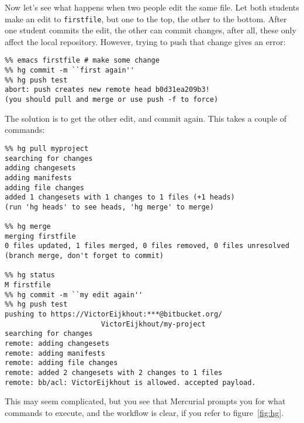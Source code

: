 Now let's see what happens when two people edit the same file.
Let both students make an edit to \verb+firstfile+, but one to the
top, the other to the bottom. After one student commits the edit, the
other can commit changes, after all, these only affect the local repository.
However, trying to push that change gives an error:
\begin{verbatim}
%% emacs firstfile # make some change
%% hg commit -m ``first again''
%% hg push test
abort: push creates new remote head b0d31ea209b3!
(you should pull and merge or use push -f to force)
\end{verbatim}
The solution is to get the other edit, and commit again. This takes a 
couple of commands:
{\small
\begin{verbatim}
%% hg pull myproject
searching for changes
adding changesets
adding manifests
adding file changes
added 1 changesets with 1 changes to 1 files (+1 heads)
(run 'hg heads' to see heads, 'hg merge' to merge)

%% hg merge
merging firstfile
0 files updated, 1 files merged, 0 files removed, 0 files unresolved
(branch merge, don't forget to commit)

%% hg status
M firstfile
%% hg commit -m ``my edit again''
%% hg push test
pushing to https://VictorEijkhout:***@bitbucket.org/
                       VictorEijkhout/my-project
searching for changes
remote: adding changesets
remote: adding manifests
remote: adding file changes
remote: added 2 changesets with 2 changes to 1 files
remote: bb/acl: VictorEijkhout is allowed. accepted payload.
\end{verbatim}
}

This may seem complicated, but you see that Mercurial prompts you 
for what commands to execute, and the workflow is clear, if you refer
to figure~\ref{fig:hg}.



